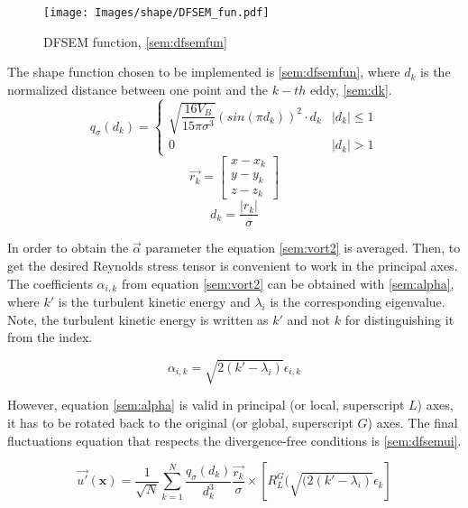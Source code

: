 \documentclass{juliacon}
\begin{document}
\begin{figure}[h]
     \centering
         \texttt{[image: Images/shape/DFSEM\_fun.pdf]}
         \caption{DFSEM function, \eqref{sem:dfsemfun}}
            \label{figsem:dfsem_fun}
\end{figure}

The shape function chosen to be implemented is \eqref{sem:dfsemfun}, where $d_k$ is the normalized distance between one point and the $k-th$ eddy, \eqref{sem:dk}.
\begin{equation}
q_\sigma (d_k) = 
\begin{cases}
  \sqrt{\dfrac{16V_B}{15\pi \sigma^3}}(sin(\pi d_k))^2\cdot d_k & |d_k|\leq 1 \\
  0 & |d_k|>1
\end{cases}
\label{sem:dfsemfun}
\end{equation}
$$
\Vec{r_k} = \begin{bmatrix}x-x_k\\y-y_k\\z-z_k\end{bmatrix}
$$
\begin{equation}
d_k = \dfrac{|r_k|}{\sigma}
\label{sem:dk}
\end{equation}


In order to obtain the $\Vec{\alpha}$ parameter the equation \eqref{sem:vort2} is averaged. Then, to get the desired Reynolds stress tensor is convenient to work in the principal axes. The coefficients $\alpha_{i,k}$ from equation \eqref{sem:vort2} can be obtained with \eqref{sem:alpha}, where $k'$ is the turbulent kinetic energy and $\lambda_i$ is the corresponding eigenvalue. Note, the turbulent kinetic energy is written as $k'$ and not $k$ for distinguishing it from the index.

\begin{equation}
    \alpha_{i,k} = \sqrt{2(k'-\lambda_i)}\epsilon_{i,k}
    \label{sem:alpha}
\end{equation}

However, equation \eqref{sem:alpha} is valid in principal (or local, superscript $L$) axes, it has to be rotated back to the original (or global, superscript $G$) axes. The final fluctuations equation that respects the divergence-free conditions is \eqref{sem:dfsemui}.


\begin{equation}
\Vec{u'}(\boldsymbol{x})=\frac{1}{\sqrt{N}} \sum_{k=1}^N \dfrac{q_\sigma(d_k)}{d_k^3} \dfrac{\Vec{r_k}}{\sigma}\times[R_L^G(\sqrt{(2(k'-\lambda_i)}\epsilon_k]
\label{sem:dfsemui}
\end{equation}
\end{document}
